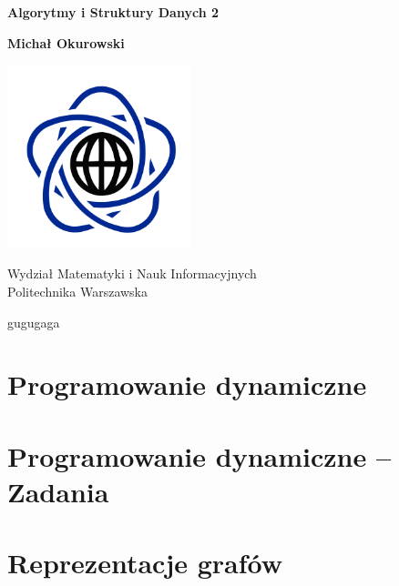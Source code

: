 



\begin{titlepage}
    \begin{center}
        \vspace*{1cm}

        \Huge

        \textbf{Algorytmy i Struktury Danych 2}

        \vspace{1.5cm}

        \LARGE

        \textbf{Michał Okurowski}

        \vfill  

        \vspace{0.8cm}

        \includegraphics[width=0.4\textwidth]{data/university.png}

        Wydział Matematyki i Nauk Informacyjnych\\
        Politechnika Warszawska\\
    \end{center}
\end{titlepage}

\tableofcontents
\pagebreak

gugugaga
\section{Programowanie dynamiczne}

\section{Programowanie dynamiczne -- Zadania}

\section{Reprezentacje grafów}

